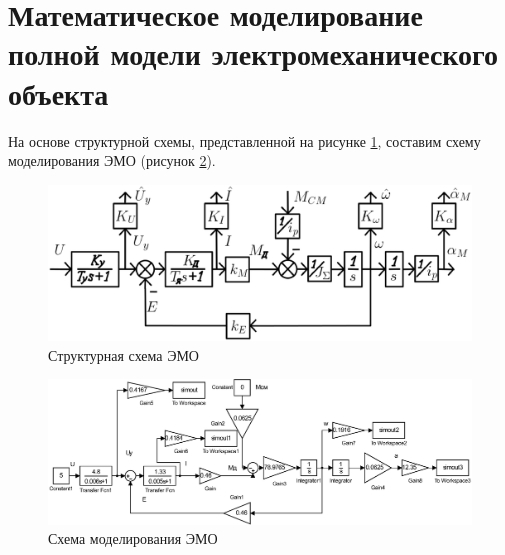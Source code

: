\documentclass[12pt,a4paper]{article}
\begin{document}
\section{Математическое моделирование полной модели электромеханического объекта}	 
На основе структурной схемы, представленной на рисунке \ref{fullScheme}, составим схему моделирования ЭМО (рисунок \ref{cxema1}).
\begin{figure}[ht!]
	\centering
	\includegraphics[width = \textwidth]{fullScheme}
	\caption{Структурная схема ЭМО}
	\label{fullScheme}
\end{figure}
\begin{figure}[ht!]
	\centering
	\includegraphics[width = \textwidth]{cxema1}
	\caption{Схема моделирования ЭМО}
	\label{cxema1}
\end{figure}
\end{document}
